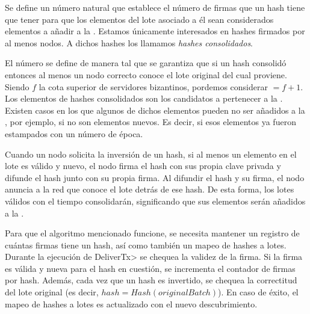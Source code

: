 %
Se define un número natural \SPH que establece
el número de firmas que un hash tiene que tener para que los elementos del lote asociado a él
sean considerados elementos a añadir a la \setchain.
%
Estamos únicamente interesados en hashes firmados por al menos \SPH
nodos. A dichos hashes los llamamos \textit{hashes consolidados}.

El número \SPH se define de manera tal que se garantiza que si un hash
consolidó entonces al menos un nodo correcto conoce el lote original del cual proviene.
%
Siendo $f$ la cota superior de servidores bizantinos, pordemos considerar \SPH $= f + 1$.
Los elementos de hashes consolidados son los candidatos a pertenecer a la \setchain.
%
Existen casos en los que algunos de dichos elementos pueden no ser añadidos a la \setchain,
por ejemplo, si no son elementos nuevos.
Es decir, si esos elementos ya fueron estampados con un número de época.

%
Cuando un nodo solicita la inversión de un hash, si al menos un elemento en el lote
es válido y nuevo, el nodo firma el hash con sus propia clave privada y difunde el hash junto
con su propia firma.
%
Al difundir el hash y su firma, el nodo anuncia a la red que conoce el lote detrás de ese hash.
%
De esta forma, los lotes válidos con el tiempo consolidarán, significando que sus elementos
serán añadidos a la \setchain.

Para que el algoritmo mencionado funcione, se necesita mantener un registro de cuántas firmas tiene un hash,
así como también un mapeo de hashes a lotes.
%
Durante la ejecución de \<DeliverTx> se chequea la validez de la firma.
%
Si la firma es válida y nueva para el hash en cuestión, se incrementa el contador de
firmas por hash.
%
Además, cada vez que un hash es invertido, se chequea la correctitud del lote original
(es decir, $hash = Hash(originalBatch)$). En caso de éxito, el mapeo de hashes a lotes
es actualizado con el nuevo descubrimiento.

%


